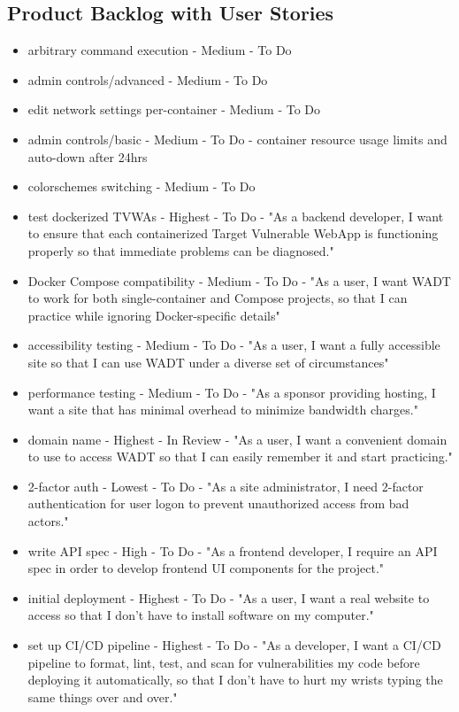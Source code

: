 \documentclass[12pt,titlepage]{article}
\begin{document}
\subsection{Product Backlog with User Stories}
\begin{itemize}
	\item arbitrary command execution - Medium - To Do
	\item admin controls/advanced - Medium - To Do
	\item edit network settings per-container - Medium - To Do
	\item admin controls/basic - Medium - To Do - container resource usage limits and auto-down after 24hrs
	\item colorschemes switching - Medium - To Do
	\item test dockerized TVWAs - Highest - To Do - "As a backend developer, I want to ensure that each containerized Target Vulnerable WebApp is functioning properly so that immediate problems can be diagnosed."
	\item Docker Compose compatibility - Medium - To Do - "As a user, I want WADT to work for both single-container and Compose projects, so that I can practice while ignoring Docker-specific details"
	\item accessibility testing - Medium - To Do - "As a user, I want a fully accessible site so that I can use WADT under a diverse set of circumstances"
	\item performance testing - Medium - To Do - "As a sponsor providing hosting, I want a site that has minimal overhead to minimize bandwidth charges."
	\item domain name - Highest - In Review - "As a user, I want a convenient domain to use to access WADT so that I can easily remember it and start practicing."
	\item 2-factor auth - Lowest - To Do - "As a site administrator, I need 2-factor authentication for user logon to prevent unauthorized access from bad actors."
	\item write API spec - High - To Do - "As a frontend developer, I require an API spec in order to develop frontend UI components for the project."
	\item initial deployment - Highest - To Do - "As a user, I want a real website to access so that I don’t have to install software on my computer."
	\item set up CI/CD pipeline - Highest - To Do - "As a developer, I want a CI/CD pipeline to format, lint, test, and scan for vulnerabilities my code before deploying it automatically, so that I don’t have to hurt my wrists typing the same things over and over."

\end{itemize}
\end{document}
